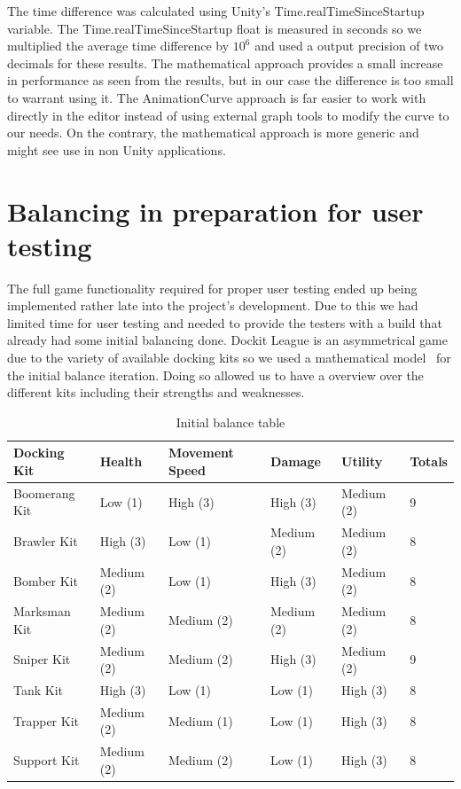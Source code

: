 The time difference was calculated using Unity's Time.realTimeSinceStartup variable. The Time.realTimeSinceStartup float is measured in seconds so we multiplied the average time difference by $10^6$ and used a output precision of two decimals for these results. 
The mathematical approach provides a small increase in performance as seen from the results, but in our case the difference is too small to warrant using it. The AnimationCurve approach is far easier to work with directly in the editor instead of using external graph tools to modify the curve to our needs. On the contrary, the mathematical approach is more generic and might see use in non Unity applications.

\section{Balancing in preparation for user testing}
The full game functionality required for proper user testing ended up being implemented rather late into the project's development. Due to this we had limited time for user testing and needed to provide the testers with a build that already had some initial balancing done. 
Dockit League is an asymmetrical game due to the variety of available docking kits so we used a mathematical model~\cite{schell2014art} for the initial balance iteration. Doing so allowed us to have a overview over the different kits including their strengths and weaknesses.

\begin{table}[tbph]
\centering
\caption{Initial balance table}
\label{tab:initBalance}
\begin{tabular}{@{}llllll@{}}
\toprule
\textbf{Docking Kit} & \textbf{Health} & \textbf{Movement Speed} & \textbf{Damage} & \textbf{Utility} & \textbf{Totals} \\ \midrule
Boomerang Kit        & Low (1)         & High (3)                & High (3)        & Medium (2)       & 9               \\
Brawler Kit          & High (3)        & Low (1)                 & Medium (2)      & Medium (2)       & 8               \\
Bomber Kit           & Medium (2)      & Low (1)                 & High (3)        & Medium (2)       & 8               \\
Marksman Kit         & Medium (2)      & Medium (2)              & Medium (2)      & Medium (2)       & 8               \\
Sniper Kit           & Medium (2)      & Medium (2)              & High (3)        & Medium (2)       & 9               \\
Tank Kit             & High (3)        & Low (1)                 & Low (1)         & High (3)         & 8               \\
Trapper Kit          & Medium (2)      & Medium (1)              & Low (1)         & High (3)         & 8               \\
Support Kit          & Medium (2)      & Medium (2)              & Low (1)         & High (3)         & 8               \\ \bottomrule
\end{tabular}
\end{table}

